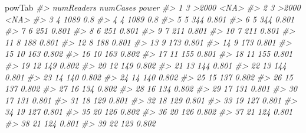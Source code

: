 \documentclass[
]{book}
\newenvironment{Shaded}{\begin{snugshade}}{\end{snugshade}}
\newcommand{\CommentTok}[1]{\textcolor[rgb]{0.56,0.35,0.01}{\textit{#1}}}
\newcommand{\NormalTok}[1]{#1}
\begin{document}
\begin{Shaded}
\begin{Highlighting}[]
\NormalTok{powTab}
\CommentTok{\#\textgreater{}     numReaders numCases power}
\CommentTok{\#\textgreater{} 1            3    \textgreater{}2000  \textless{}NA\textgreater{}}
\CommentTok{\#\textgreater{} 2            3    \textgreater{}2000  \textless{}NA\textgreater{}}
\CommentTok{\#\textgreater{} 3            4     1089   0.8}
\CommentTok{\#\textgreater{} 4            4     1089   0.8}
\CommentTok{\#\textgreater{} 5            5      344 0.801}
\CommentTok{\#\textgreater{} 6            5      344 0.801}
\CommentTok{\#\textgreater{} 7            6      251 0.801}
\CommentTok{\#\textgreater{} 8            6      251 0.801}
\CommentTok{\#\textgreater{} 9            7      211 0.801}
\CommentTok{\#\textgreater{} 10           7      211 0.801}
\CommentTok{\#\textgreater{} 11           8      188 0.801}
\CommentTok{\#\textgreater{} 12           8      188 0.801}
\CommentTok{\#\textgreater{} 13           9      173 0.801}
\CommentTok{\#\textgreater{} 14           9      173 0.801}
\CommentTok{\#\textgreater{} 15          10      163 0.802}
\CommentTok{\#\textgreater{} 16          10      163 0.802}
\CommentTok{\#\textgreater{} 17          11      155 0.801}
\CommentTok{\#\textgreater{} 18          11      155 0.801}
\CommentTok{\#\textgreater{} 19          12      149 0.802}
\CommentTok{\#\textgreater{} 20          12      149 0.802}
\CommentTok{\#\textgreater{} 21          13      144 0.801}
\CommentTok{\#\textgreater{} 22          13      144 0.801}
\CommentTok{\#\textgreater{} 23          14      140 0.802}
\CommentTok{\#\textgreater{} 24          14      140 0.802}
\CommentTok{\#\textgreater{} 25          15      137 0.802}
\CommentTok{\#\textgreater{} 26          15      137 0.802}
\CommentTok{\#\textgreater{} 27          16      134 0.802}
\CommentTok{\#\textgreater{} 28          16      134 0.802}
\CommentTok{\#\textgreater{} 29          17      131 0.801}
\CommentTok{\#\textgreater{} 30          17      131 0.801}
\CommentTok{\#\textgreater{} 31          18      129 0.801}
\CommentTok{\#\textgreater{} 32          18      129 0.801}
\CommentTok{\#\textgreater{} 33          19      127 0.801}
\CommentTok{\#\textgreater{} 34          19      127 0.801}
\CommentTok{\#\textgreater{} 35          20      126 0.802}
\CommentTok{\#\textgreater{} 36          20      126 0.802}
\CommentTok{\#\textgreater{} 37          21      124 0.801}
\CommentTok{\#\textgreater{} 38          21      124 0.801}
\CommentTok{\#\textgreater{} 39          22      123 0.802}

\end{Highlighting}
\end{Shaded}
\end{document}
